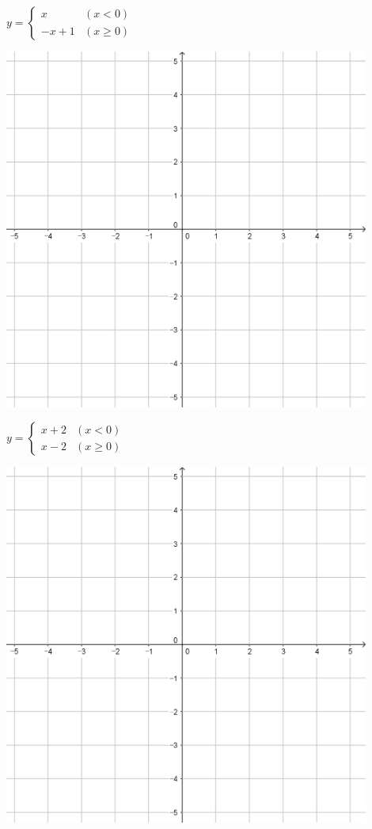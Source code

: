 \documentclass[a4paper]{oblivoir}
\begin{document}
\clearpage
\begin{minipage}{0.45\textwidth}\centering
\(y=\begin{cases}x&(x<0)\\-x+1&(x\ge0)\end{cases}\)
\par\bigskip\includegraphics[width=0.9\textwidth]{55}
\end{minipage}
\begin{minipage}{0.45\textwidth}\centering
\(y=\begin{cases}x+2&(x<0)\\x-2&(x\ge0)\end{cases}\)
\par\bigskip\includegraphics[width=0.9\textwidth]{55}
\end{minipage}\bigskip\bigskip\par
\end{document}
